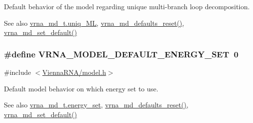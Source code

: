 Default behavior of the model regarding unique multi-\/branch loop decomposition. 

\begin{DoxySeeAlso}{See also}
\hyperlink{structvrna__md__s_ade065b814a4e2e72ead93ab502613ed2}{vrna\+\_\+md\+\_\+t.\+uniq\+\_\+\+ML}, \hyperlink{group__model__details_ga70834424cf804d149937de89f80ceb45}{vrna\+\_\+md\+\_\+defaults\+\_\+reset()}, \hyperlink{group__model__details_ga8ac6ff84936282436f822644bf841f66}{vrna\+\_\+md\+\_\+set\+\_\+default()} 
\end{DoxySeeAlso}
\subsubsection[{\texorpdfstring{V\+R\+N\+A\+\_\+\+M\+O\+D\+E\+L\+\_\+\+D\+E\+F\+A\+U\+L\+T\+\_\+\+E\+N\+E\+R\+G\+Y\+\_\+\+S\+ET}{VRNA_MODEL_DEFAULT_ENERGY_SET}}]{\setlength{\rightskip}{0pt plus 5cm}\#define V\+R\+N\+A\+\_\+\+M\+O\+D\+E\+L\+\_\+\+D\+E\+F\+A\+U\+L\+T\+\_\+\+E\+N\+E\+R\+G\+Y\+\_\+\+S\+ET~0}\hypertarget{group__model__details_ga6fcf6b2d0f89256cdbd166486c9b6e1e}{}\label{group__model__details_ga6fcf6b2d0f89256cdbd166486c9b6e1e}


{\ttfamily \#include $<$\hyperlink{model_8h}{Vienna\+R\+N\+A/model.\+h}$>$}



Default model behavior on which energy set to use. 

\begin{DoxySeeAlso}{See also}
\hyperlink{structvrna__md__s_a5eee4e3b468eb690d1407e0178dafb3f}{vrna\+\_\+md\+\_\+t.\+energy\+\_\+set}, \hyperlink{group__model__details_ga70834424cf804d149937de89f80ceb45}{vrna\+\_\+md\+\_\+defaults\+\_\+reset()}, \hyperlink{group__model__details_ga8ac6ff84936282436f822644bf841f66}{vrna\+\_\+md\+\_\+set\+\_\+default()} 
\end{DoxySeeAlso}

